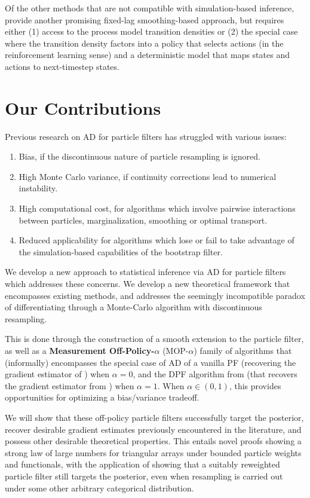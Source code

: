 \documentclass{article}
\begin{document}
Of the other methods that are not compatible with simulation-based inference, \citet{doucet2022particlebased} provide another promising fixed-lag smoothing-based approach, but requires either (1) access to the process model transition densities or (2) the special case where the transition density factors into a policy that selects actions (in the reinforcement learning sense) and a deterministic model that maps states and actions to next-timestep states. 

\section{Our Contributions}

Previous research on AD for particle filters has struggled with various issues: 
\begin{enumerate}
    \item Bias, if the discontinuous nature of particle resampling is ignored.
    \item High Monte Carlo variance, if continuity corrections lead to numerical instability.
    \item High computational cost, for algorithms which involve pairwise interactions between particles, marginalization, smoothing or optimal transport.
    \item Reduced applicability for algorithms which lose or fail to take advantage of the simulation-based capabilities of the bootstrap filter.
\end{enumerate}

We develop a new approach to statistical inference via AD for particle filters which addresses these concerns. We develop a new theoretical framework that encompasses existing methods, and addresses the seemingly incompatible paradox of differentiating through a Monte-Carlo algorithm with discontinuous resampling.

This is done through the construction of a smooth extension to the particle filter, as well as a \textbf{Measurement Off-Policy-$\alpha$} (MOP-$\alpha$) family of algorithms that (informally) encompasses the special case of AD of a vanilla PF (recovering the gradient estimator of \citet{blei2018vsmc}) when $\alpha=0$, and the DPF algorithm from \citet{scibior2021dpf} (that recovers the gradient estimator from \citet{poyiadjis11}) when $\alpha=1$. When $\alpha \in (0,1)$, this provides opportunities for optimizing a bias/variance tradeoff. 

We will show that these off-policy particle filters successfully target the posterior, recover desirable gradient estimates previously encountered in the literature, and possess other desirable theoretical properties. This entails novel proofs showing a strong law of large numbers for triangular arrays under bounded particle weights and functionals, with the application of showing that a suitably reweighted particle filter still targets the posterior, even when resampling is carried out under some other arbitrary categorical distribution.
\end{document}
